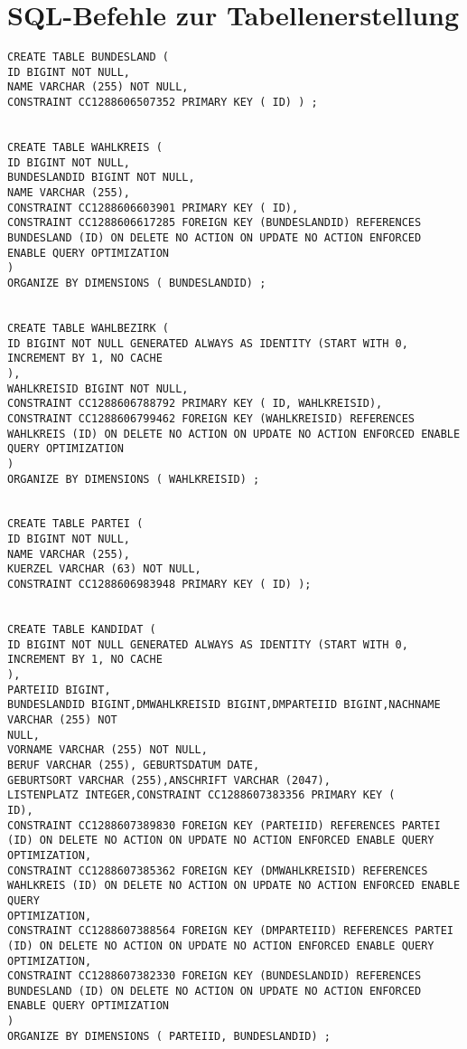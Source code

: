 \chapter{SQL-Befehle zur Tabellenerstellung}

\lstset{language=SQL}


\begin{lstlisting}
CREATE TABLE BUNDESLAND (
ID BIGINT NOT NULL,
NAME VARCHAR (255) NOT NULL,
CONSTRAINT CC1288606507352 PRIMARY KEY ( ID) ) ;


CREATE TABLE WAHLKREIS (
ID BIGINT NOT NULL,
BUNDESLANDID BIGINT NOT NULL,
NAME VARCHAR (255),
CONSTRAINT CC1288606603901 PRIMARY KEY ( ID),
CONSTRAINT CC1288606617285 FOREIGN KEY (BUNDESLANDID) REFERENCES BUNDESLAND (ID) ON DELETE NO ACTION ON UPDATE NO ACTION ENFORCED ENABLE QUERY OPTIMIZATION
)
ORGANIZE BY DIMENSIONS ( BUNDESLANDID) ;


CREATE TABLE WAHLBEZIRK (
ID BIGINT NOT NULL GENERATED ALWAYS AS IDENTITY (START WITH 0, INCREMENT BY 1, NO CACHE
),
WAHLKREISID BIGINT NOT NULL,
CONSTRAINT CC1288606788792 PRIMARY KEY ( ID, WAHLKREISID),
CONSTRAINT CC1288606799462 FOREIGN KEY (WAHLKREISID) REFERENCES WAHLKREIS (ID) ON DELETE NO ACTION ON UPDATE NO ACTION ENFORCED ENABLE QUERY OPTIMIZATION
)
ORGANIZE BY DIMENSIONS ( WAHLKREISID) ;


CREATE TABLE PARTEI (
ID BIGINT NOT NULL,
NAME VARCHAR (255),
KUERZEL VARCHAR (63) NOT NULL,
CONSTRAINT CC1288606983948 PRIMARY KEY ( ID) );


CREATE TABLE KANDIDAT (
ID BIGINT NOT NULL GENERATED ALWAYS AS IDENTITY (START WITH 0, INCREMENT BY 1, NO CACHE
),
PARTEIID BIGINT,
BUNDESLANDID BIGINT,DMWAHLKREISID BIGINT,DMPARTEIID BIGINT,NACHNAME VARCHAR (255) NOT
NULL,
VORNAME VARCHAR (255) NOT NULL,
BERUF VARCHAR (255), GEBURTSDATUM DATE,
GEBURTSORT VARCHAR (255),ANSCHRIFT VARCHAR (2047),
LISTENPLATZ INTEGER,CONSTRAINT CC1288607383356 PRIMARY KEY (
ID),
CONSTRAINT CC1288607389830 FOREIGN KEY (PARTEIID) REFERENCES PARTEI (ID) ON DELETE NO ACTION ON UPDATE NO ACTION ENFORCED ENABLE QUERY
OPTIMIZATION,
CONSTRAINT CC1288607385362 FOREIGN KEY (DMWAHLKREISID) REFERENCES WAHLKREIS (ID) ON DELETE NO ACTION ON UPDATE NO ACTION ENFORCED ENABLE QUERY
OPTIMIZATION,
CONSTRAINT CC1288607388564 FOREIGN KEY (DMPARTEIID) REFERENCES PARTEI (ID) ON DELETE NO ACTION ON UPDATE NO ACTION ENFORCED ENABLE QUERY
OPTIMIZATION,
CONSTRAINT CC1288607382330 FOREIGN KEY (BUNDESLANDID) REFERENCES BUNDESLAND (ID) ON DELETE NO ACTION ON UPDATE NO ACTION ENFORCED ENABLE QUERY OPTIMIZATION
)
ORGANIZE BY DIMENSIONS ( PARTEIID, BUNDESLANDID) ;



\end{lstlisting}
